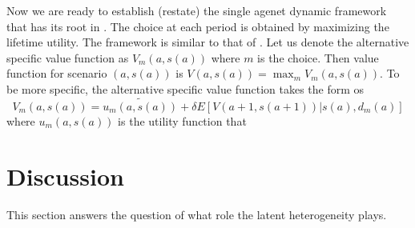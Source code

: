 \documentclass[12pt]{article}
\begin{document}
Now we are ready to establish (restate) the single agenet dynamic framework that has its root in \cite{rust}.
The choice at each period is obtained by maximizing the lifetime utility. The framework is similar to that of \cite{rust}.
Let us denote the alternative specific value function as $V_m(a, s(a))$ where $m$ is the choice. Then value function for scenario $(a, s(a))$ is $V(a, s(a)) = \max_m V_m(a, s(a))$. 
To be more specific, the alternative specific value function takes the form os 
$$V_m(a, s(a)) = \tilde{u_m(a, s(a))} + \delta E[V(a+1, s(a+1))|s(a), d_m(a)]$$
where $u_m(a, s(a))$ is the utility function that 

\section{Discussion}
This section answers the question of what role the latent heterogeneity plays.

\pagebreak \newpage 
\end{document}
